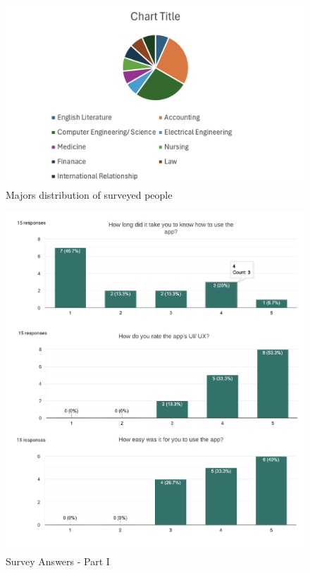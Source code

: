 \documentclass[a4paper, 12pt]{report} %
\begin{document}
                \begin{figure}[H]
                    \centering
                    \includegraphics[width=\linewidth]{Images/survey_fields.png}
                    \caption{Majors distribution of surveyed people}
                    \label{fig:survey_fields}
                \end{figure}

                \begin{figure}[H]
                    \centering
                    \includegraphics[width=\linewidth]{Images/survey_2.png}
                    \caption{Survey Answers - Part I}
                    \label{fig:survey_1}
                \end{figure}
\end{document}
